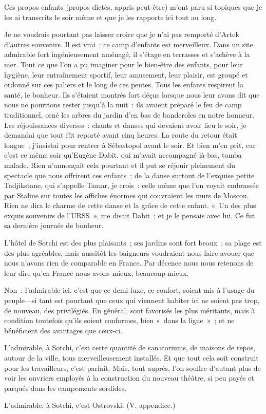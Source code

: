 \documentclass[twoside]{book} %
\newcommand{\astermono}{\medskip\centerline{\color{rubric}\large\selectfont{\syms ✻}}\medskip\par}%
\begin{document}
Ces propos enfants (propos dictés, appris peut-être) m’ont paru si topiques que je les ai transcrits le soir même et que je les rapporte ici tout au long.\par
Je ne voudrais pourtant pas laisser croire que je n’ai pas remporté d’Artek d’autres souvenirs. Il est vrai : ce camp d’enfants est merveilleux. Dans un site admirable fort ingénieusement aménagé, il s’étage en terrasses et s’achève à la mer. Tout ce que l’on a pu imaginer pour le bien-être des enfants, pour leur hygiène, leur entraînement sportif, leur amusement, leur plaisir, est groupé et ordonné sur ces paliers et le long de ces pentes. Tous les enfants respirent la santé, le bonheur. Ils s’étaient montrés fort déçus lorsque nous leur avons dit que nous ne pourrions rester jusqu’à la nuit : ils avaient préparé le feu de camp traditionnel, orné les arbres du jardin d’en bas de banderoles en notre honneur. Les réjouissances diverses : chants et danses qui devaient avoir lieu le soir, je demandai que tout fût reporté avant cinq heures. La route du retour était longue ; j’insistai pour rentrer à Sébastopol avant le soir. Et bien m’en prit, car c’est ce même soir qu’Eugène Dabit, qui m’avait accompagné là-bas, tomba malade. Rien n’annonçait cela pourtant et il put se réjouir pleinement du spectacle que nous offrirent ces enfants ; de la danse surtout de l’exquise petite Tadjikstane, qui s’appelle Tamar, je crois : celle même que l’on voyait embrassée par Staline sur toutes les affiches énormes qui couvraient les murs de Moscou. Rien ne dira le charme de cette danse et la grâce de cette enfant. « Un des plus exquis souvenirs de l’URSS », me disait Dabit ; et je le pensais avec lui. Ce fut sa dernière journée de bonheur.\par

\astermono

\noindent L’hôtel de Sotchi est des plus plaisants ; ses jardins sont fort beaux ; sa plage est des plus agréables, mais aussitôt les baigneurs voudraient nous faire avouer que nous n’avons rien de comparable en France. Par décence nous nous retenons de leur dire qu’en France nous avons mieux, beaucoup mieux.\par
Non : l’admirable ici, c’est que ce demi-luxe, ce confort, soient mis à l’usage du peuple—si tant est pourtant que ceux qui viennent habiter ici ne soient pas trop, de nouveau, des privilégiés. En général, sont favorisés les plus méritants, mais à condition toutefois qu’ils soient conformes, bien « dans la ligne » ; et ne bénéficient des avantages que ceux-ci.\par
L’admirable, à Sotchi, c’est cette quantité de sanatoriums, de maisons de repos, autour de la ville, tous merveilleusement installés. Et que tout cela soit construit pour les travailleurs, c’est parfait. Mais, tout auprès, l’on souffre d’autant plus de voir les ouvriers employés à la construction du nouveau théâtre, si peu payés et parqués dans les campements sordides.\par
L’admirable, à Sotchi, c’est Ostrovski. (V. appendice.)\par
\end{document}
